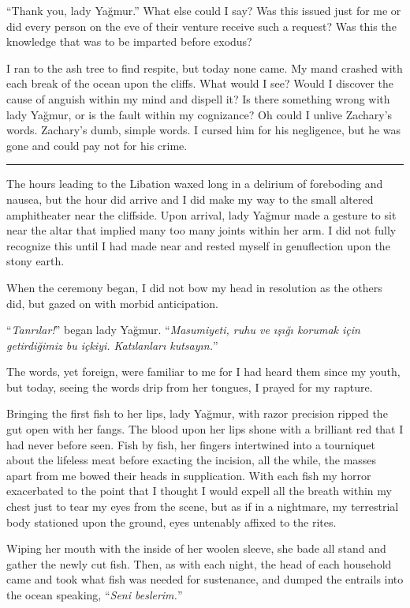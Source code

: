 ``Thank you, lady Yağmur.'' What else could I say? Was this issued just for me or did every person
on the eve of their venture receive such a request? Was this the knowledge that was to be imparted
before exodus?

I ran to the ash tree to find respite, but today none came. My mand crashed with each break of the
ocean upon the cliffs. What would I see? Would I discover the cause of anguish within my mind and
dispell it? Is there something wrong with lady Yağmur, or is the fault within my cognizance? Oh
could I unlive Zachary's words. Zachary's dumb, simple words. I cursed him for his negligence, but
he was gone and could pay not for his crime.

\noindent\rule{\textwidth}{1pt}

The hours leading to the Libation waxed long in a delirium of foreboding and nausea, but the hour
did arrive and I did make my way to the small altered amphitheater near the cliffside. Upon arrival,
lady Yağmur made a gesture to sit near the altar that implied many too many joints within her arm. I
did not fully recognize this until I had made near and rested myself in genuflection upon the stony
earth.

When the ceremony began, I did not bow my head in resolution as the others did, but gazed on with
morbid anticipation.

``\textit{Tanrılar!}'' began lady Yağmur. ``\textit{Masumiyeti, ruhu ve ışığı korumak için
getirdiğimiz bu içkiyi. Katılanları kutsayın.}''

The words, yet foreign, were familiar to me for I had heard them since my youth, but today,
seeing the words drip from her tongues, I prayed for my rapture.

Bringing the first fish to her lips, lady Yağmur, with razor precision ripped the gut open with her
fangs. The blood upon her lips shone with a brilliant red that I had never before seen. Fish by fish,
her fingers intertwined into a tourniquet about the lifeless meat before exacting the incision, all
the while, the masses apart from me bowed their heads in supplication. With each fish my horror
exacerbated to the point that I thought I would expell all the breath within my chest just to tear
my eyes from the scene, but as if in a nightmare, my terrestrial body stationed upon the ground,
eyes untenably affixed to the rites.

Wiping her mouth with the inside of her woolen sleeve, she bade all stand and gather the newly cut
fish. Then, as with each night, the head of each household came and took what fish was needed for
sustenance, and dumped the entrails into the ocean speaking, ``\textit{Seni beslerim.}''

